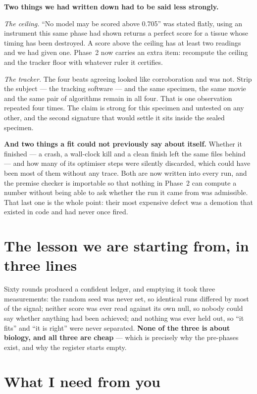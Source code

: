 \documentclass[11pt,a4paper]{article}
\begin{document}
\textbf{Two things we had written down had to be said less strongly.}

\emph{The ceiling.} ``No model may be scored above 0.705'' was stated flatly, using an instrument
this same phase had shown returns a perfect score for a tissue whose timing has been destroyed. A
score above the ceiling has at least two readings and we had given one. Phase~2 now carries an
extra item: recompute the ceiling and the tracker floor with whatever ruler it certifies.

\emph{The tracker.} The four beats agreeing looked like corroboration and was not. Strip the
subject --- the tracking software --- and the same specimen, the same movie and the same pair of
algorithms remain in all four. That is one observation repeated four times. The claim is strong for
this specimen and untested on any other, and the second signature that would settle it sits inside
the sealed specimen.

\textbf{And two things a fit could not previously say about itself.} Whether it finished --- a
crash, a wall-clock kill and a clean finish left the same files behind --- and how many of its
optimiser steps were silently discarded, which could have been most of them without any trace. Both
are now written into every run, and the premise checker is importable so that nothing in Phase~2
can compute a number without being able to ask whether the run it came from was admissible. That
last one is the whole point: their most expensive defect was a demotion that existed in code and
had never once fired.

\section{The lesson we are starting from, in three lines}

Sixty rounds produced a confident ledger, and emptying it took three measurements: the random seed
was never set, so identical runs differed by most of the signal; neither score was ever read against
its own null, so nobody could say whether anything had been achieved; and nothing was ever held out,
so ``it fits'' and ``it is right'' were never separated. \textbf{None of the three is about biology,
and all three are cheap} --- which is precisely why the pre-phases exist, and why the register starts
empty.

\section{What I need from you}
\end{document}
